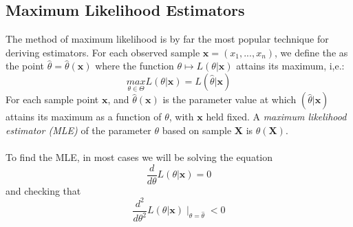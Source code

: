 \subsection{Maximum Likelihood Estimators}
The method of maximum likelihood is by far the most popular technique for deriving estimators. For each observed sample $\boldsymbol{x} = (x_1,...,x_n)$, we define the  as the point $\hat{\theta} = \hat{\theta} (\boldsymbol{x})$ where the function $\theta \mapsto L(\theta | \boldsymbol{x})$ attains its maximum, i,e.:
$$
\underset{\theta \in \Theta}{max}L(\theta|\boldsymbol{x}) = L(\hat{\theta}|\boldsymbol{x})$$
For each sample point $\boldsymbol{x}$, and $ \hat{\theta} (\boldsymbol{x})$ is the parameter value at which  $(\hat{\theta}|\boldsymbol{x})$ attains its maximum as a function of $\theta$, with $\boldsymbol{x}$ held fixed. A \textit{maximum likelihood estimator (MLE)} of the parameter $\theta$ based on sample $\boldsymbol{X}$ is $\hat{\theta}(\boldsymbol{X})$. 
\\
\\
To find the MLE, in most cases we will be solving the equation
$$
\frac{d}{d\theta} L(\theta|\boldsymbol{x}) = 0
$$
and checking that
$$
\frac{d^2}{d\theta^2} L(\theta|\boldsymbol{x}) \mid_{\theta = \hat{\theta}} < 0
$$
